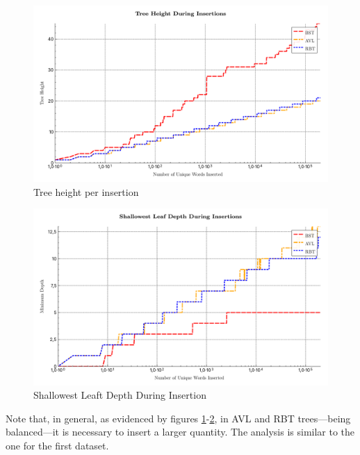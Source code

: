  \begin{figure}[H]
     \centering
     \includegraphics[width=0.75\linewidth]{img/Graph_1_199865.pdf}
     \caption{Tree height per insertion}
     \label{fig:maiorgalho2}
 \end{figure}

 \begin{figure}[H]
     \centering
     \includegraphics[width=0.75\linewidth]{img/Graph_2_199865.pdf}
     \caption{Shallowest Leaft Depth During Insertion}
     \label{fig:menorgalho2}
 \end{figure}

 Note that, in general, as evidenced by figures \ref{fig:maiorgalho2}-\ref{fig:menorgalho2}, in AVL and RBT trees—being balanced—it is necessary to insert a larger quantity. The analysis is similar to the one 
 for the first dataset.

 